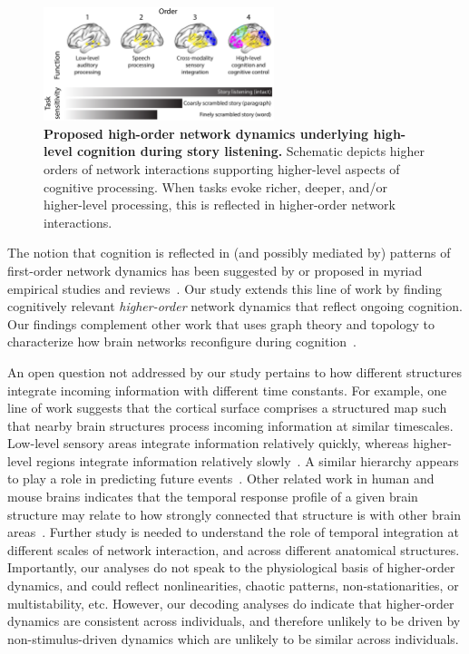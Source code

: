 \documentclass[english]{article}
\begin{document}
\begin{figure}[tp]
  \centering
  \includegraphics[width=0.6\textwidth]{figs/discussion}
  \caption{\textbf{Proposed high-order network dynamics underlying
      high-level cognition during story listening.}  Schematic depicts
    higher orders of
    network interactions supporting higher-level aspects of cognitive
    processing.  When tasks evoke richer, deeper, and/or higher-level
    processing, this is reflected in higher-order network
    interactions.}
  \label{fig:discussion}
\end{figure}

The notion that cognition is reflected in (and possibly mediated by)
patterns of first-order network dynamics has been suggested by or
proposed in myriad empirical studies and
reviews~\citep[e.g.,][]{DemeEtal19, Turk13, LuriEtal18, FongEtal19,
  ParkEtal18b, PretEtal17, RoyEtal19, LiegEtal19, ZouEtal19,
  ChanGlov10, GonzEtal19}.  Our study extends this line of work by
finding cognitively relevant \textit{higher-order} network dynamics
that reflect ongoing cognition.  Our findings complement other work
that uses graph theory and topology to characterize how brain networks
reconfigure during cognition~\citep[e.g.,][]{BassEtal06, ZhenEtal19,
  McInJirs19, TokeSomm19, SizeEtal18, ReimEtal17, BetzEtal19}.

An open question not addressed by our study pertains to how different
structures integrate incoming information with different time
constants.  For example, one line of work suggests that the cortical
surface comprises a structured map such that nearby brain structures
process incoming information at similar timescales.  Low-level sensory
areas integrate information relatively quickly, whereas higher-level
regions integrate information relatively slowly~\citep{BaldEtal17,
  HassEtal08, HassEtal15, HoneEtal12a, LernEtal11, LernEtal14,
  ChieHone19}.  A similar hierarchy appears to play a role in
predicting future events~\citep{LeeEtal20}.  Other
related work in human and mouse brains indicates that the temporal
response profile of a given brain structure may relate to how strongly
connected that structure is with other brain
areas~\citep{FallEtal19}.  Further study is needed to understand the
role of temporal integration at different scales of network
interaction, and across different anatomical structures. Importantly,
our analyses do not speak to the physiological basis of higher-order
dynamics, and could reflect nonlinearities, chaotic patterns,
non-stationarities, or multistability, etc. However, our decoding analyses do indicate
that higher-order dynamics are
consistent across individuals, and therefore unlikely to be driven by
non-stimulus-driven dynamics which are unlikely to be similar across
individuals.
\end{document}
